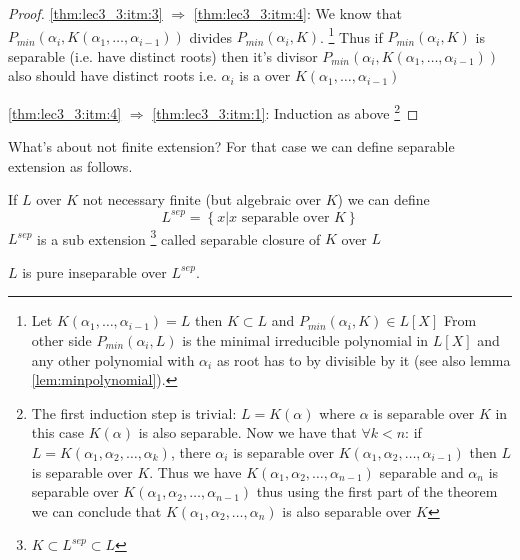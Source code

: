 \begin{theorem}
\begin{proof}
    \ref{thm:lec3_3:itm:3} $\Rightarrow$ \ref{thm:lec3_3:itm:4}:
    We know that
    $P_{min}\left(\alpha_i, K\left(\alpha_1, \dots,
    \alpha_{i-1}\right)\right)$ divides
    $P_{min}\left(\alpha_i, K\right)$.
    \footnote{
      Let $K\left(\alpha_1, \dots, \alpha_{i-1}\right) = L$
      then $K \subset L$ and
      $P_{min}\left(\alpha_i, K\right) \in L\left[ X \right]$
      From other side $P_{min}\left(\alpha_i, L\right)$ is the minimal
      irreducible polynomial  in $L\left[X\right]$ and any other
      polynomial with $\alpha_i$ as root has to by divisible by it
      (see also lemma \ref{lem:minpolynomial}).
    }
    Thus if 
    $P_{min}\left(\alpha_i, K\right)$ is separable (i.e. have distinct
    roots) then it's divisor $P_{min}\left(\alpha_i, K\left(\alpha_1, \dots,
    \alpha_{i-1}\right)\right)$ also should have distinct roots i.e.
    $\alpha_i$ is a  over
    $K\left(\alpha_1, \dots,\alpha_{i-1}\right)$
    
    \ref{thm:lec3_3:itm:4} $\Rightarrow$ \ref{thm:lec3_3:itm:1}:
    Induction as above
    \footnote{
      The first induction step is trivial: $L=K\left(\alpha\right)$
      where $\alpha$ is separable over $K$ in this case
      $K\left(\alpha\right)$ is also separable.
      Now we have that $\forall k < n$:
      if $L = K\left(\alpha_1, \alpha_2, \dots, \alpha_k\right)$, there
      $\alpha_i$ is separable over
      $K\left(\alpha_1, \alpha_2, \dots, \alpha_{i-1}\right)$ then $L$
      is separable over $K$. Thus we have
      $K\left(\alpha_1, \alpha_2, \dots, \alpha_{n-1}\right)$
      separable and $\alpha_n$ is separable over $K\left(\alpha_1,
      \alpha_2, \dots, \alpha_{n-1}\right)$ thus using the first part
      of the theorem we can conclude that 
      $K\left(\alpha_1, \alpha_2, \dots, \alpha_{n}\right)$ is also
      separable over $K$
    }    
  \end{proof}
\end{theorem}

What's about not finite extension? For that case we can define
separable extension as follows.
\begin{definition}
  If $L$ over $K$ not necessary finite (but algebraic over $K$) we can
  define
  \[
  L^{sep} = \left\{x \vert x \mbox{ separable over } K \right\}
  \]
  $L^{sep}$ is a sub extension
  \footnote{
    $K \subset L^{sep} \subset L$
  }
  called separable closure of $K$ over
  $L$
  \label{def:separableclosure}
\end{definition}
$L$ is pure inseparable over $L^{sep}$.

